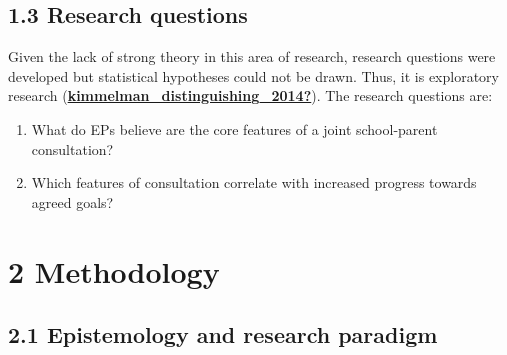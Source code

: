 \documentclass[
]{article}
\begin{document}
\hypertarget{research-questions}{%
\subsection{1.3 Research questions}\label{research-questions}}

Given the lack of strong theory in this area of research, research
questions were developed but statistical hypotheses could not be drawn.
Thus, it is exploratory research
(\protect\hyperlink{ref-kimmelman_distinguishing_2014}{\textbf{kimmelman\_distinguishing\_2014?}}).
The research questions are:

\begin{enumerate}
\def\labelenumi{\arabic{enumi}.}
\item
  What do EPs believe are the core features of a joint school-parent
  consultation?
\item
  Which features of consultation correlate with increased progress
  towards agreed goals?
\end{enumerate}

\hypertarget{methodology}{%
\section{2 Methodology}\label{methodology}}

\hypertarget{epistemology-and-research-paradigm}{%
\subsection{2.1 Epistemology and research
paradigm}\label{epistemology-and-research-paradigm}}
\end{document}
